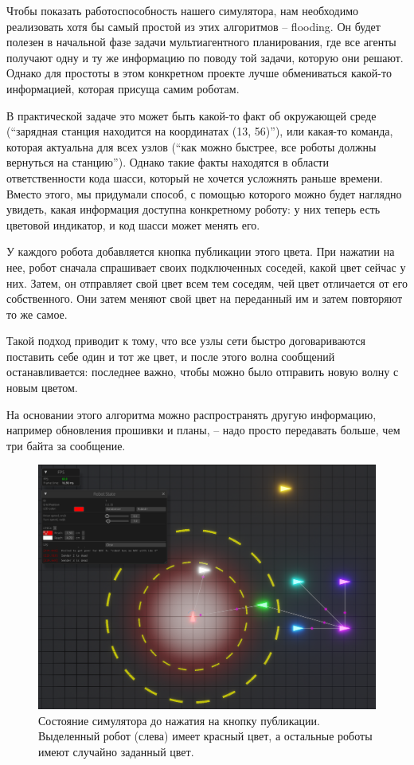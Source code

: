 \documentclass[%
]{report}
\begin{document}
Чтобы показать работоспособность нашего симулятора,
нам необходимо реализовать хотя бы самый простой из этих алгоритмов -- flooding.
Он будет полезен в начальной фазе задачи мультиагентного планирования,
где все агенты получают одну и ту же информацию
по поводу той задачи, которую они решают.
Однако для простоты в этом конкретном проекте лучше обмениваться какой-то информацией,
которая присуща самим роботам.

В практической задаче это может быть какой-то факт об окружающей среде
(``зарядная станция находится на координатах (13, 56)''),
или какая-то команда, которая актуальна для всех узлов
(``как можно быстрее, все роботы должны вернуться на станцию'').
Однако такие факты находятся в области ответственности кода шасси,
который не хочется усложнять раньше времени.
Вместо этого, мы придумали способ,
с помощью которого можно будет наглядно увидеть, какая информация доступна конкретному роботу:
у них теперь есть цветовой индикатор,
и код шасси может менять его.

У каждого робота добавляется кнопка публикации этого цвета.
При нажатии на нее, робот сначала спрашивает своих подключенных соседей,
какой цвет сейчас у них.
Затем, он отправляет свой цвет всем тем соседям,
чей цвет отличается от его собственного.
Они затем меняют свой цвет на переданный им
и затем повторяют то же самое.

Такой подход приводит к тому,
что все узлы сети быстро договариваются поставить себе один и тот же цвет,
и после этого волна сообщений останавливается:
последнее важно, чтобы можно было отправить новую волну с новым цветом.

На основании этого алгоритма можно распространять другую информацию, например обновления прошивки и планы, --
надо просто передавать больше, чем три байта за сообщение.

\begin{figure}
  \includegraphics[width = \textwidth]{colors-1.png}
  \caption{Состояние симулятора до нажатия на кнопку публикации. Выделенный робот (слева)
  имеет красный цвет, а остальные роботы имеют случайно заданный цвет.}
\end{figure}
\end{document}
